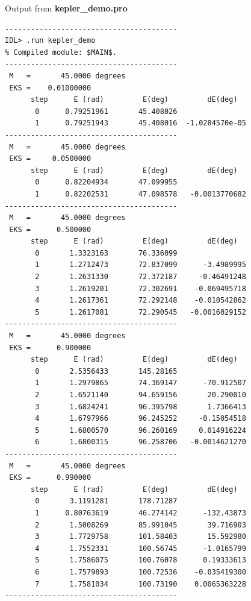 \documentclass[a4paper,12pt]{article}
\def\black{\color{RGBblack}}
\begin{document}
{{{\begin{verbatim}
\end{verbatim}} \black



\newpage

\bul Output from {\bf kepler\_demo.pro} 

{\scriptsize \begin{verbatim}
----------------------------------------
IDL> .run kepler_demo
% Compiled module: $MAIN$.
----------------------------------------
 M   =       45.0000 degrees
 EKS =    0.01000000
      step      E (rad)         E(deg)         dE(deg) 
       0      0.79251961       45.408026
       1      0.79251943       45.408016  -1.0284570e-05
----------------------------------------
 M   =       45.0000 degrees
 EKS =     0.0500000
      step      E (rad)         E(deg)         dE(deg) 
       0      0.82204934       47.099955
       1      0.82202531       47.098578   -0.0013770682
----------------------------------------
 M   =       45.0000 degrees
 EKS =      0.500000
      step      E (rad)         E(deg)         dE(deg) 
       0       1.3323163       76.336099
       1       1.2712473       72.837099      -3.4989995
       2       1.2631330       72.372187     -0.46491248
       3       1.2619201       72.302691    -0.069495718
       4       1.2617361       72.292148    -0.010542862
       5       1.2617081       72.290545   -0.0016029152
----------------------------------------
 M   =       45.0000 degrees
 EKS =      0.900000
      step      E (rad)         E(deg)         dE(deg) 
       0       2.5356433       145.28165
       1       1.2979865       74.369147      -70.912507
       2       1.6521140       94.659156       20.290010
       3       1.6824241       96.395798       1.7366413
       4       1.6797966       96.245252     -0.15054518
       5       1.6800570       96.260169     0.014916224
       6       1.6800315       96.258706   -0.0014621270
----------------------------------------
 M   =       45.0000 degrees
 EKS =      0.990000
      step      E (rad)         E(deg)         dE(deg) 
       0       3.1191281       178.71287
       1      0.80763619       46.274142      -132.43873
       2       1.5008269       85.991045       39.716903
       3       1.7729758       101.58403       15.592980
       4       1.7552331       100.56745      -1.0165799
       5       1.7586075       100.76078      0.19333613
       6       1.7579893       100.72536    -0.035419300
       7       1.7581034       100.73190    0.0065363228
----------------------------------------



\end{verbatim}}}}
\end{document}
